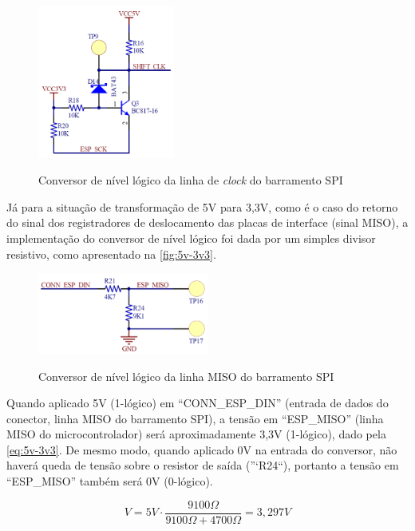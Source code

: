 \begin{figure}[H]
    \centering
    \caption{Conversor de nível lógico da linha de \emph{clock} do barramento SPI}
    \includegraphics[width=0.4\textwidth]{./dados/figuras/3v3-5v}
    \label{fig:3v3-5v}
\end{figure}

Já para a situação de transformação de 5V para 3,3V, como é o caso do retorno do sinal dos registradores de deslocamento das placas de interface (sinal MISO), a implementação do conversor de nível lógico foi dada por um simples divisor resistivo, como apresentado na \autoref{fig:5v-3v3}.

\begin{figure}[H]
    \centering
    \caption{Conversor de nível lógico da linha MISO do barramento SPI}
    \includegraphics[width=0.5\textwidth]{./dados/figuras/5v-3v3}
    \label{fig:5v-3v3}
\end{figure}

Quando aplicado 5V (1-lógico) em ``CONN\_ESP\_DIN'' (entrada de dados do conector, linha MISO do barramento SPI), a tensão em ``ESP\_MISO'' (linha MISO do microcontrolador) será aproximadamente 3,3V (1-lógico), dado pela \autoref{eq:5v-3v3}. De mesmo modo, quando aplicado 0V na entrada do conversor, não haverá queda de tensão sobre o resistor de saída (''`R24``), portanto a tensão em ``ESP\_MISO'' também será 0V (0-lógico).

\begin{equation}
    V = 5V \cdot \frac{9100\Omega}{9100\Omega+4700\Omega} = 3,297V
    \label{eq:5v-3v3}
\end{equation}

